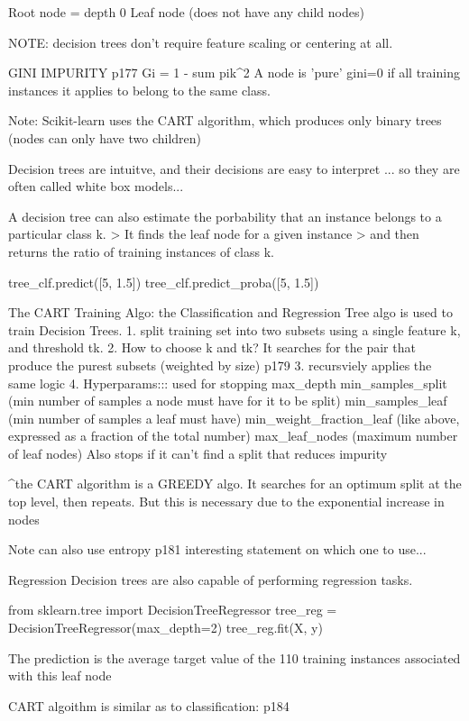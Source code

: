 Root node = depth 0
Leaf node (does not have any child nodes)

NOTE:
decision trees don't require feature scaling or centering at all.

GINI IMPURITY
p177
Gi = 1 - sum pik^2
A node is 'pure' gini=0
if all training instances it applies to belong to the same class.

Note:
Scikit-learn uses the CART algorithm,
which produces only binary trees (nodes can only have two children)

Decision trees are intuitve,
and their decisions are easy to interpret
... so they are often called white box models...

A decision tree can also estimate the porbability
that an instance belongs to a particular class k.
> It finds the leaf node for a given instance
> and then returns the ratio of training instances of class k.

tree_clf.predict([5, 1.5]) 
tree_clf.predict_proba([5, 1.5])

The CART Training Algo:
the Classification and Regression Tree algo is used to train Decision Trees.
1. split training set into two subsets using a single feature k, and threshold tk.
2. How to choose k and tk?
It searches for the pair that produce the purest subsets (weighted by size)
p179
3. recursviely applies the same logic
4. Hyperparams::: used for stopping
max_depth
min_samples_split (min number of samples a node must have for it to be split)
min_samples_leaf (min number of samples a leaf must have)
min_weight_fraction_leaf (like above, expressed as a fraction of the total number)
max_leaf_nodes (maximum number of leaf nodes)
Also stops if it can't find a split that reduces impurity

^the CART algorithm is a GREEDY algo.
It searches for an optimum split at the top level, then repeats.
But this is necessary due to the exponential increase in nodes

Note can also use entropy p181
interesting statement on which one to use...

Regression
Decision trees are also capable of performing regression tasks.

from sklearn.tree import DecisionTreeRegressor
tree_reg = DecisionTreeRegressor(max_depth=2)
tree_reg.fit(X, y)

The prediction is the average target value of the
110 training instances associated with this leaf node

CART algoithm is similar as to classification: p184

